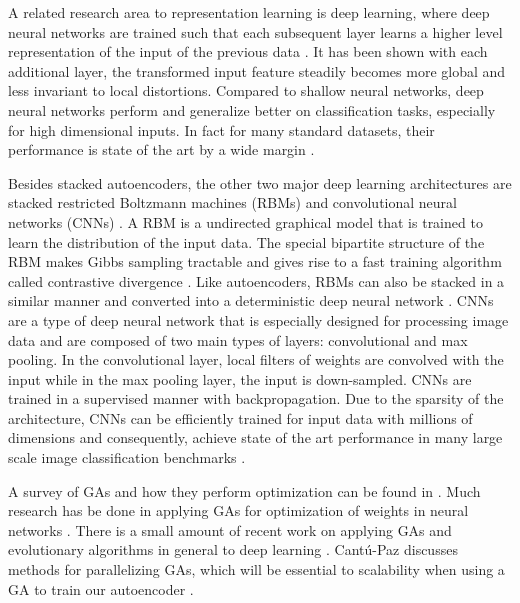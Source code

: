 A related research area to representation learning is deep learning, where deep neural networks are trained such that each subsequent layer learns a higher level representation of the input of the previous data \cite{bengio2009learning}. It has been shown with each additional layer, the transformed input feature steadily becomes more global and less invariant to local distortions. Compared to shallow neural networks, deep neural networks perform and generalize better on classification tasks, especially for high dimensional inputs. In fact for many standard datasets, their performance is state of the art by a wide margin \cite{schmidhuber2014deep}. 

Besides stacked autoencoders, the other two major deep learning architectures are stacked restricted Boltzmann machines (RBMs) \cite{hinton2006fast} and convolutional neural networks (CNNs) \cite{lecun1995convolutional}. A RBM is a undirected graphical model that is trained to learn the distribution of the input data. The special bipartite structure of the RBM makes Gibbs sampling tractable and gives rise to a fast training algorithm called contrastive divergence \cite{hinton2006fast,hinton2006learning}. Like autoencoders, RBMs can also be stacked in a similar manner and converted into a deterministic deep neural network \cite{hinton2006reducing}. CNNs are a type of deep neural network that is especially designed for processing image data and are composed of two main types of layers: convolutional and max pooling. In the convolutional layer, local filters of weights are convolved with the input while in the max pooling layer, the input is down-sampled. CNNs are trained in a supervised manner with backpropagation. Due to the sparsity of the architecture, CNNs can be efficiently trained for input data with millions of dimensions and consequently, achieve state of the art performance in many large scale image classification benchmarks \cite{ciresan2011committee,krizhevsky2012imagenet,goodfellow2013multi}.

A survey of GAs and how they perform optimization can be found in \cite{srinivas1994genetic}. Much research has be done in applying GAs for optimization of weights in neural networks \cite{gomez2006efficient,floreano2008neuroevolution}. There is a small amount of recent work on applying GAs and evolutionary algorithms in general to deep learning \cite{koutnik2014evolving,david2014genetic}. Cant{\'u}-Paz discusses methods for parallelizing GAs, which will be essential to scalability when using a GA to train our autoencoder \cite{cantu1998survey}.

